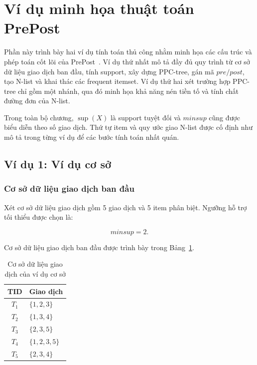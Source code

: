 \section{Ví dụ minh họa thuật toán PrePost}
\label{sec:prepost-examples}

Phần này trình bày hai ví dụ tính toán thủ công nhằm minh họa các cấu trúc và
phép toán cốt lõi của PrePost~\cite{deng2012prepost}. Ví dụ thứ nhất mô tả đầy
đủ quy trình từ cơ sở dữ liệu giao dịch ban đầu, tính support, xây dựng
PPC-tree, gán mã $pre/post$, tạo N-list và khai thác các frequent itemset. Ví dụ
thứ hai xét trường hợp PPC-tree chỉ gồm một nhánh, qua đó minh họa khả năng nén
tiền tố và tính chất đường đơn của N-list.

Trong toàn bộ chương, $\operatorname{sup}(X)$ là support tuyệt đối và
$\mathit{minsup}$ cũng được biểu diễn theo số giao dịch. Thứ tự item và quy ước
giao N-list được cố định như mô tả trong từng ví dụ để các bước tính toán nhất
quán.

\subsection{Ví dụ 1: Ví dụ cơ sở}

\subsubsection{Cơ sở dữ liệu giao dịch ban đầu}

Xét cơ sở dữ liệu giao dịch gồm 5 giao dịch và 5 item phân biệt. Ngưỡng hỗ trợ tối thiểu được chọn là:

\begin{equation}
    \mathit{minsup} = 2.
    \label{eq:chapter2-basic-minsup}
\end{equation}

Cơ sở dữ liệu giao dịch ban đầu được trình bày trong Bảng~\ref{tab:basic-tdb}.

\begin{table}[H]
\centering
\caption{Cơ sở dữ liệu giao dịch của ví dụ cơ sở}
\label{tab:basic-tdb}
\begin{tabular}{cl}
\toprule
TID & Giao dịch \\
\midrule
$T_1$ & $\{1,2,3\}$ \\
$T_2$ & $\{1,3,4\}$ \\
$T_3$ & $\{2,3,5\}$ \\
$T_4$ & $\{1,2,3,5\}$ \\
$T_5$ & $\{2,3,4\}$ \\
\bottomrule
\end{tabular}
\end{table}

